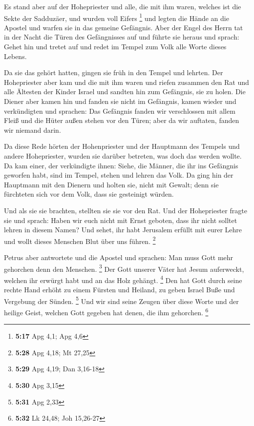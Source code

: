  Es stand aber auf der Hohepriester und alle, die mit ihm
waren, welches ist die Sekte der Sadduzäer, und wurden voll Eifers
\footnote{\textbf{5:17} Apg 4,1; Apg 4,6}  und legten die
Hände an die Apostel und warfen sie in das gemeine Gefängnis.
 Aber der Engel des Herrn tat in der Nacht die Türen des
Gefängnisses auf und führte sie heraus und sprach:  Gehet
hin und tretet auf und redet im Tempel zum Volk alle Worte dieses
Lebens.

 Da sie das gehört hatten, gingen sie früh in den Tempel
und lehrten. Der Hohepriester aber kam und die mit ihm waren und riefen
zusammen den Rat und alle Ältesten der Kinder Israel und sandten hin zum
Gefängnis, sie zu holen.  Die Diener aber kamen hin und
fanden sie nicht im Gefängnis, kamen wieder und verkündigten
 und sprachen: Das Gefängnis fanden wir verschlossen mit
allem Fleiß und die Hüter außen stehen vor den Türen; aber da wir
auftaten, fanden wir niemand darin.

 Da diese Rede hörten der Hohenpriester und der Hauptmann
des Tempels und andere Hohepriester, wurden sie darüber betreten, was
doch das werden wollte.  Da kam einer, der verkündigte
ihnen: Siehe, die Männer, die ihr ins Gefängnis geworfen habt, sind im
Tempel, stehen und lehren das Volk.  Da ging hin der
Hauptmann mit den Dienern und holten sie, nicht mit Gewalt; denn sie
fürchteten sich vor dem Volk, dass sie gesteinigt würden.

 Und als sie sie brachten, stellten sie sie vor den Rat.
Und der Hohepriester fragte sie  und sprach: Haben wir euch
nicht mit Ernst geboten, dass ihr nicht solltet lehren in diesem Namen?
Und sehet, ihr habt Jerusalem erfüllt mit eurer Lehre und wollt dieses
Menschen Blut über uns führen. \footnote{\textbf{5:28} Apg 4,18; Mt
  27,25}

 Petrus aber antwortete und die Apostel und sprachen: Man
muss Gott mehr gehorchen denn den Menschen. \footnote{\textbf{5:29} Apg
  4,19; Dan 3,16-18}  Der Gott unserer Väter hat Jesum
auferweckt, welchen ihr erwürgt habt und an das Holz gehängt.
\footnote{\textbf{5:30} Apg 3,15}  Den hat Gott durch seine
rechte Hand erhöht zu einem Fürsten und Heiland, zu geben Israel Buße
und Vergebung der Sünden. \footnote{\textbf{5:31} Apg 2,33}
 Und wir sind seine Zeugen über diese Worte und der heilige
Geist, welchen Gott gegeben hat denen, die ihm gehorchen. \footnote{\textbf{5:32}
  Lk 24,48; Joh 15,26-27}

